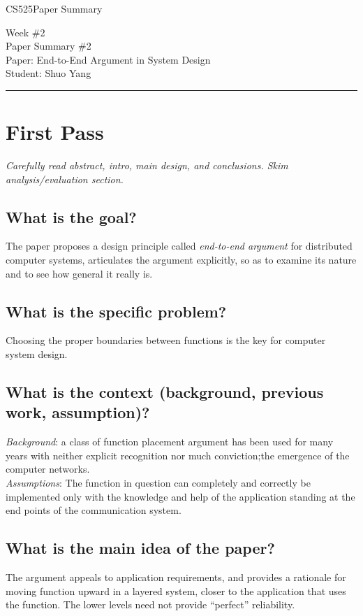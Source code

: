 \documentclass[11pt]{article}
\def\CourseCode{CS525}
\def\WeekNo{2}
\def\PaperNo{2}
\def\Category{Paper Summary}
\def\PaperTitle{End-to-End Argument in System Design}
\def\Author{Shuo Yang}
\begin{document}
\noindent

\CourseCode \hfill \Category

\begin{center}
Week \#\WeekNo\\
Paper Summary \#\PaperNo\\
Paper: \PaperTitle\\
Student: \Author\\
\end{center}

\hrule\smallskip

\section{First Pass}

\emph{Carefully read abstract, intro, main design, and
  conclusions. Skim analysis/evaluation section.}

\subsection{What is the goal?}
The paper proposes a design principle called \emph{end-to-end
  argument} for distributed computer systems, articulates the argument
explicitly, so as to examine its nature and to see how general it
really is. 

\subsection{What is the specific problem?}
Choosing the proper boundaries between functions is the key for
computer system design. 

\subsection{What is the context (background, previous work,
  assumption)?} 
\emph{Background}: a class of function placement argument has been
used for many years with neither explicit recognition nor much
conviction;the emergence of the computer networks.\\
\emph{Assumptions}: The function in question can completely and
correctly be implemented only with the knowledge and help of the
application standing at the end points of the communication system.

\subsection{What is the main idea of the paper?}
The argument appeals to application requirements, and provides a
rationale for moving function upward in a layered system, closer to
the application that uses the function. The lower levels need not
provide ``perfect'' reliability.
\end{document}
